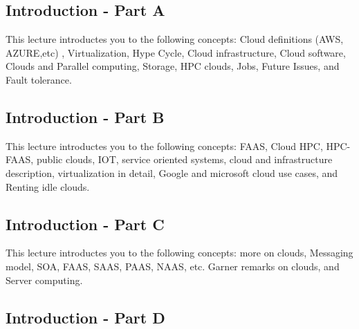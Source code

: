 \subsection{Introduction - Part A}\label{s:cloud-fundamentals-a}


This lecture introductes you to the following concepts: Cloud
definitions (AWS, AZURE,etc) , Virtualization, Hype Cycle, Cloud
infrastructure, Cloud software, Clouds and Parallel computing,
Storage, HPC clouds, Jobs, Future Issues, and Fault tolerance.

\subsection{Introduction - Part B}\label{s:cloud-fundamentals-b}


This lecture introductes you to the following concepts: FAAS, Cloud
HPC, HPC-FAAS, public clouds, IOT, service oriented systems, cloud and
infrastructure description, virtualization in detail, Google and
microsoft cloud use cases, and Renting idle clouds.

\subsection{Introduction - Part C}\label{s:cloud-fundamentals-c}


This lecture introductes you to the following concepts: more on
clouds, Messaging model, SOA, FAAS, SAAS, PAAS, NAAS, etc. Garner
remarks on clouds, and Server computing.

\subsection{Introduction - Part D}\label{s:cloud-fundamentals-d}

